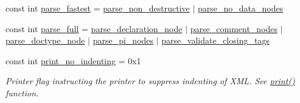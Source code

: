 \begin{DoxyCompactItemize}
\item 
const int \hyperlink{namespacerapidxml_a64da06dfdab7c86ca954bda4fecb978f}{parse\_\-fastest} = \hyperlink{namespacerapidxml_a45d4d8fef551beaaba23a83b847fd6a3}{parse\_\-non\_\-destructive} $|$ \hyperlink{namespacerapidxml_ac2d21ef14a4e8936b94aca5d38b1a74d}{parse\_\-no\_\-data\_\-nodes}
\item 
const int \hyperlink{namespacerapidxml_abb48dc65db75d9e49734bc5bd2fabbfc}{parse\_\-full} = \hyperlink{namespacerapidxml_a999d782659513f8015ea4236e3204c42}{parse\_\-declaration\_\-node} $|$ \hyperlink{namespacerapidxml_ae093dd49e2f59fa39eee95f1a6568e32}{parse\_\-comment\_\-nodes} $|$ \hyperlink{namespacerapidxml_a41002b49780a90a0bbcc28ce8b895fe4}{parse\_\-doctype\_\-node} $|$ \hyperlink{namespacerapidxml_a03fe68fcf5d28f38476e0fd31adecc4c}{parse\_\-pi\_\-nodes} $|$ \hyperlink{namespacerapidxml_a7ce8f40fda68338e20b56f41e48e49f3}{parse\_\-validate\_\-closing\_\-tags}
\item 
const int \hyperlink{namespacerapidxml_a65477b812a80f5bda693ec57e57de064}{print\_\-no\_\-indenting} = 0x1
\begin{DoxyCompactList}\small\item\em Printer flag instructing the printer to suppress indenting of XML. See \hyperlink{namespacerapidxml_ab94d570fc4c4ab2423813cd0243326b1}{print()} function. \item\end{DoxyCompactList}\end{DoxyCompactItemize}


